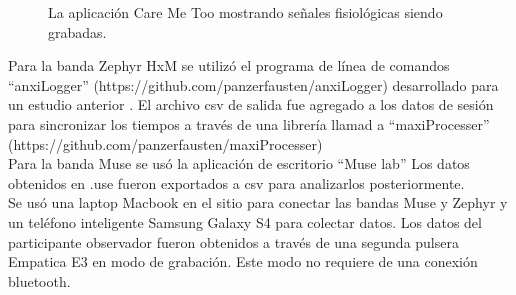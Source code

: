 \begin{figure}[h]
        \centering
        \caption{La aplicaci\'on Care Me Too mostrando se\~nales fisiol\'ogicas siendo grabadas.}\label{fig:caremetoo}
\end{figure}

Para la banda Zephyr HxM se utiliz\'o el programa de l\'inea de comandos ``anxiLogger'' (https://github.com/panzerfausten/anxiLogger) desarrollado para un estudio anterior \cite{Miranda}. El archivo csv de salida fue agregado a los datos de sesi\'on para sincronizar los tiempos a trav\'es de una librer\'ia llamad a ``maxiProcesser'' (https://github.com/panzerfausten/maxiProcesser)
\\
Para la banda Muse se us\'o la aplicaci\'on de escritorio ``Muse lab'' Los datos obtenidos en .use fueron exportados a csv para analizarlos posteriormente.
\\
Se us\'o una laptop Macbook en el sitio para conectar las bandas Muse y Zephyr y un tel\'efono inteligente Samsung Galaxy S4 para colectar datos. Los datos del participante observador fueron obtenidos a trav\'es de una segunda pulsera Empatica E3 en modo de grabaci\'on. Este modo no requiere de una conexi\'on bluetooth.

